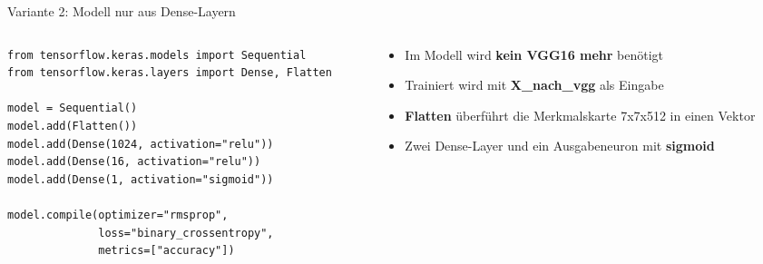 \begin{frame}[fragile]{Variante 2: Modell nur aus Dense-Layern}
\begin{columns}
\begin{column}{0.6\textwidth}
\begin{verbatim}
from tensorflow.keras.models import Sequential
from tensorflow.keras.layers import Dense, Flatten

model = Sequential()
model.add(Flatten())
model.add(Dense(1024, activation="relu"))
model.add(Dense(16, activation="relu"))
model.add(Dense(1, activation="sigmoid"))

model.compile(optimizer="rmsprop",
              loss="binary_crossentropy",
              metrics=["accuracy"])
\end{verbatim}
\end{column}
\begin{column}{0.35\textwidth}
\begin{itemize}
  \item Im Modell wird \textbf{kein VGG16 mehr} benötigt
  \item Trainiert wird mit \textbf{X\_nach\_vgg} als Eingabe
  \item \textbf{Flatten} überführt die Merkmalskarte 7x7x512 in einen Vektor
  \item Zwei Dense-Layer und ein Ausgabeneuron mit \textbf{sigmoid}
\end{itemize}
\end{column}
\end{columns}
\end{frame}


